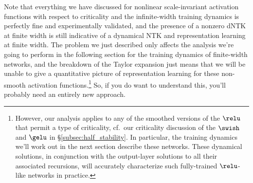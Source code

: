 Note that everything we have discussed for nonlinear scale-invariant activation functions with respect to criticality and the infinite-width training dynamics is perfectly fine and experimentally validated, and the presence of a nonzero dNTK at finite width is still indicative of a dynamical NTK and representation learning at finite width. 
The problem we just described only affects the analysis we're going to perform in the following section for the  training dynamics of finite-width networks, 
and the breakdown of the Taylor expansion just means that we will be unable to give a quantitative picture of representation learning for these non-smooth activation functions.\footnote{
    However, our analysis applies to any of the smoothed versions of the $\relu$ that permit a type of criticality, cf.~our criticality discussion of the $\swish$ and $\gelu$ in \S\ref{subsec:half_stability}. In particular, the training dynamics we'll work out in the next section describe these networks.
    These dynamical solutions, in conjunction with the output-layer solutions to all their associated recursions, will accurately characterize such fully-trained $\relu$-like networks in practice.
}
So, if you do want to understand this, you'll probably need an entirely new approach.

